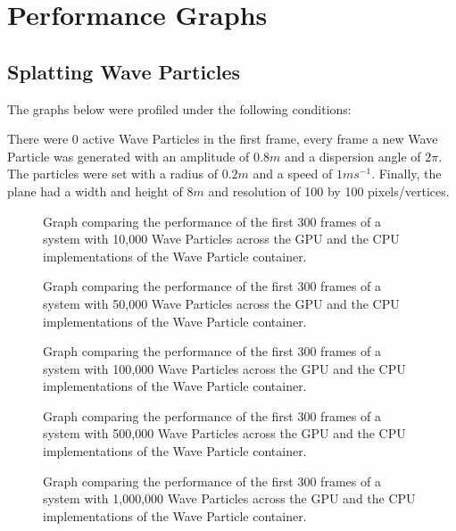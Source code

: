 \documentclass[12pt,a4paper,twoside]{report}
\begin{document}
\chapter{Performance Graphs}

\section{Splatting Wave Particles}
\label{app:performance_graphs_splatting}

The graphs below were profiled under the following conditions:

There were $0$ active Wave Particles in the first frame, every frame a new Wave
Particle was generated with an amplitude of $0.8m$ and a dispersion angle of
$2\pi$. The particles were set with a radius of $0.2m$ and a speed of
$1ms^{-1}$. Finally, the plane had a width and height of $8m$ and resolution of
100 by 100 pixels/vertices.

\begin{figure}[H]
\centering

\caption{Graph comparing the performance of the first 300 frames of a system
with 10,000 Wave Particles across the GPU and the CPU implementations of the
Wave Particle container.}
\end{figure}

\begin{figure}[H]
\centering

\caption{Graph comparing the performance of the first 300 frames of a system
with 50,000 Wave Particles across the GPU and the CPU implementations of the
Wave Particle container.}
\end{figure}

\begin{figure}[H]
\centering

\caption{Graph comparing the performance of the first 300 frames of a system
with 100,000 Wave Particles across the GPU and the CPU implementations of the
Wave Particle container.}
\end{figure}

\begin{figure}[H]
\centering

\caption{Graph comparing the performance of the first 300 frames of a system
with 500,000 Wave Particles across the GPU and the CPU implementations of the
Wave Particle container.}
\end{figure}

\begin{figure}[H]
\centering

\caption{Graph comparing the performance of the first 300 frames of a system
with 1,000,000 Wave Particles across the GPU and the CPU implementations of the
Wave Particle container.}
\end{figure}
\end{document}
